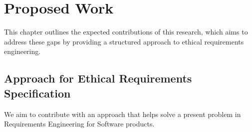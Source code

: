 
%

\chapter{Proposed Work}
\label{cha:proposed_work}


\epigraphfontsize{\small\itshape}
\setlength\epigraphwidth{12.5cm}
\setlength\epigraphrule{0pt}

This chapter outlines the expected contributions of this research, which aims to address these gaps by providing a structured approach to ethical requirements engineering.


\section{Approach for Ethical Requirements Specification}
We aim to contribute with an approach that helps solve a present problem in Requirements Engineering for Software products.

